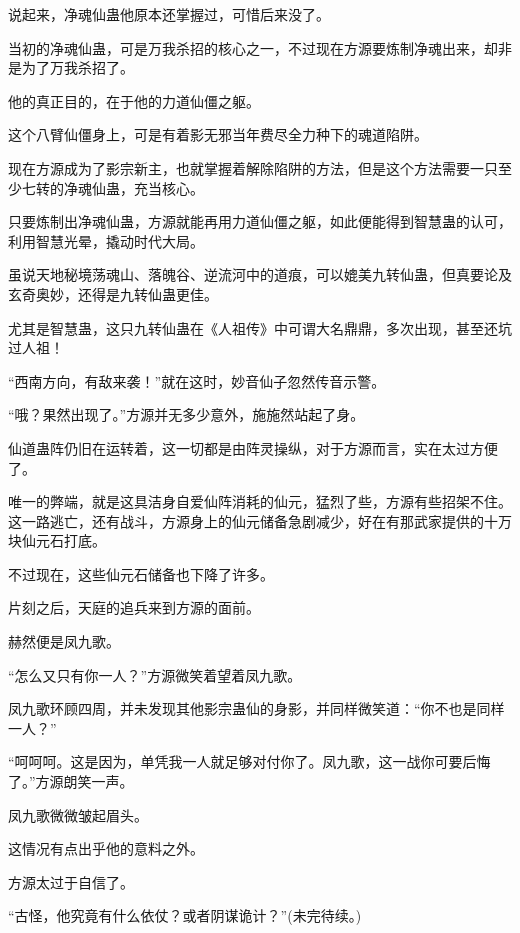 \begin{this_body}
说起来，净魂仙蛊他原本还掌握过，可惜后来没了。

当初的净魂仙蛊，可是万我杀招的核心之一，不过现在方源要炼制净魂出来，却非是为了万我杀招了。

他的真正目的，在于他的力道仙僵之躯。

这个八臂仙僵身上，可是有着影无邪当年费尽全力种下的魂道陷阱。

现在方源成为了影宗新主，也就掌握着解除陷阱的方法，但是这个方法需要一只至少七转的净魂仙蛊，充当核心。

只要炼制出净魂仙蛊，方源就能再用力道仙僵之躯，如此便能得到智慧蛊的认可，利用智慧光晕，撬动时代大局。

虽说天地秘境荡魂山、落魄谷、逆流河中的道痕，可以媲美九转仙蛊，但真要论及玄奇奥妙，还得是九转仙蛊更佳。

尤其是智慧蛊，这只九转仙蛊在《人祖传》中可谓大名鼎鼎，多次出现，甚至还坑过人祖！

“西南方向，有敌来袭！”就在这时，妙音仙子忽然传音示警。

“哦？果然出现了。”方源并无多少意外，施施然站起了身。

仙道蛊阵仍旧在运转着，这一切都是由阵灵操纵，对于方源而言，实在太过方便了。

唯一的弊端，就是这具洁身自爱仙阵消耗的仙元，猛烈了些，方源有些招架不住。这一路逃亡，还有战斗，方源身上的仙元储备急剧减少，好在有那武家提供的十万块仙元石打底。

不过现在，这些仙元石储备也下降了许多。

片刻之后，天庭的追兵来到方源的面前。

赫然便是凤九歌。

“怎么又只有你一人？”方源微笑着望着凤九歌。

凤九歌环顾四周，并未发现其他影宗蛊仙的身影，并同样微笑道：“你不也是同样一人？”

“呵呵呵。这是因为，单凭我一人就足够对付你了。凤九歌，这一战你可要后悔了。”方源朗笑一声。

凤九歌微微皱起眉头。

这情况有点出乎他的意料之外。

方源太过于自信了。

“古怪，他究竟有什么依仗？或者阴谋诡计？”(未完待续。)

\end{this_body}

